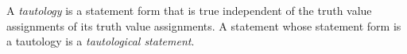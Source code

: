 \guard



\begin{defn}
\label{defn:tautology}
  A \emph{tautology} is a statement form that is true independent of the truth value assignments of its truth value assignments.
  A statement whose statement form is a tautology is a \emph{tautological statement}.
\end{defn}
